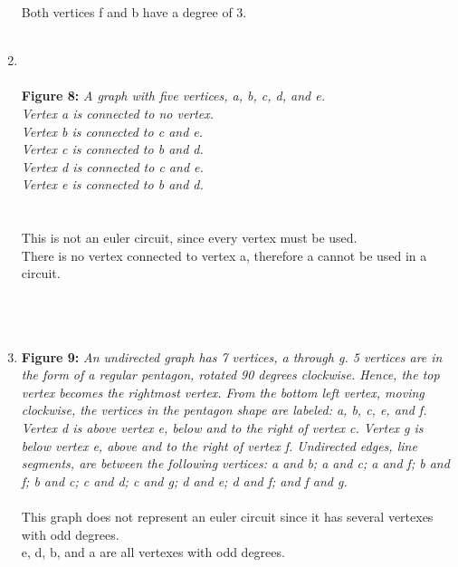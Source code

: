 \documentclass{amsart}
\theoremstyle{definition}
\theoremstyle{Exercise}
\theoremstyle{remark}
\theoremstyle{rule}
\numberwithin{equation}{section}
\begin{document}
\begin{enumerate}[label=(\roman*)]
  Both vertices f and b have a degree of 3.
\\\\
   \newpage
\item 
{}
\\\\
{\color{blue} {\bf Figure 8: } \emph{A graph with five vertices, a, b, c, d,  and e.\\ Vertex a is connected to no vertex.\\
  Vertex b is connected to c and e.\\
  Vertex c is connected to b and d.\\
  Vertex d is connected to c and e.\\
  Vertex e is connected to b and d.\\
  }
}
\\\\
  This is not an euler circuit, since every vertex must be used.\\
  There is no vertex connected to vertex a, therefore a cannot be used in a circuit.
\\\\

\newpage
{}
\\\\
\item {\color{blue} {\bf Figure 9:} \emph{An undirected graph has 7 vertices, a through g. 5 vertices are in the form of a regular pentagon, rotated 90 degrees clockwise. Hence, the top vertex becomes the rightmost vertex. From the bottom left vertex, moving clockwise, the vertices in the pentagon shape are labeled: a, b, c, e, and f. Vertex d is above vertex e, below and to the right of vertex c. Vertex g is below vertex e, above and to the right of vertex f. Undirected edges, line segments, are between the following vertices: a and b; a and c; a and f; b and f; b and c; c and d; c and g; d and e; d and f; and f and g.
  }
}
\\\\
  This graph does not represent an euler circuit since it has several vertexes with odd degrees.\\
  e, d, b, and a are all vertexes with odd degrees.
\\\\


  \end{enumerate}
\newpage
\end{document}
